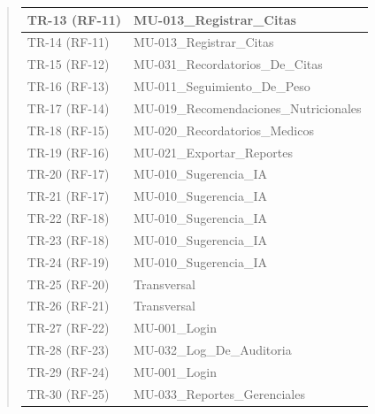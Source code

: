 \documentclass[
]{article}
\begin{document}
\begin{quote}
{\begin{longtable}[]{|
  >{\centering\arraybackslash}p{}|
  >{\raggedright\arraybackslash}p{}|}
\hline
TR-13 (RF-11) & MU-013\_Registrar\_Citas \\
\hline
TR-14 (RF-11) & MU-013\_Registrar\_Citas \\
\hline
TR-15 (RF-12) & \begin{minipage}[t]{\linewidth}\raggedright
MU-031\_Recordatorios\_De\_Citas
\end{minipage} \\
\hline
TR-16 (RF-13) & \begin{minipage}[t]{\linewidth}\raggedright
MU-011\_Seguimiento\_De\_Peso
\end{minipage} \\
\hline
TR-17 (RF-14) & \begin{minipage}[t]{\linewidth}\raggedright
MU-019\_Recomendaciones\_Nutricionales
\end{minipage} \\
\hline
TR-18 (RF-15) & \begin{minipage}[t]{\linewidth}\raggedright
MU-020\_Recordatorios\_Medicos
\end{minipage} \\
\hline
TR-19 (RF-16) & \begin{minipage}[t]{\linewidth}\raggedright
MU-021\_Exportar\_Reportes
\end{minipage} \\
\hline
TR-20 (RF-17) & MU-010\_Sugerencia\_IA \\
\hline
TR-21 (RF-17) & MU-010\_Sugerencia\_IA \\
\hline
TR-22 (RF-18) & MU-010\_Sugerencia\_IA \\
\hline
TR-23 (RF-18) & MU-010\_Sugerencia\_IA \\
\hline
TR-24 (RF-19) & MU-010\_Sugerencia\_IA \\
\hline
TR-25 (RF-20) & Transversal \\
\hline
TR-26 (RF-21) & Transversal \\
\hline
TR-27 (RF-22) & MU-001\_Login \\
\hline
TR-28 (RF-23) & \begin{minipage}[t]{\linewidth}\raggedright
MU-032\_Log\_De\_Auditoria
\end{minipage} \\
\hline
TR-29 (RF-24) & MU-001\_Login \\
\hline
TR-30 (RF-25) & \begin{minipage}[t]{\linewidth}\raggedright
MU-033\_Reportes\_Gerenciales
\end{minipage} \\
\hline

\end{longtable}}
\end{quote}
\end{document}
